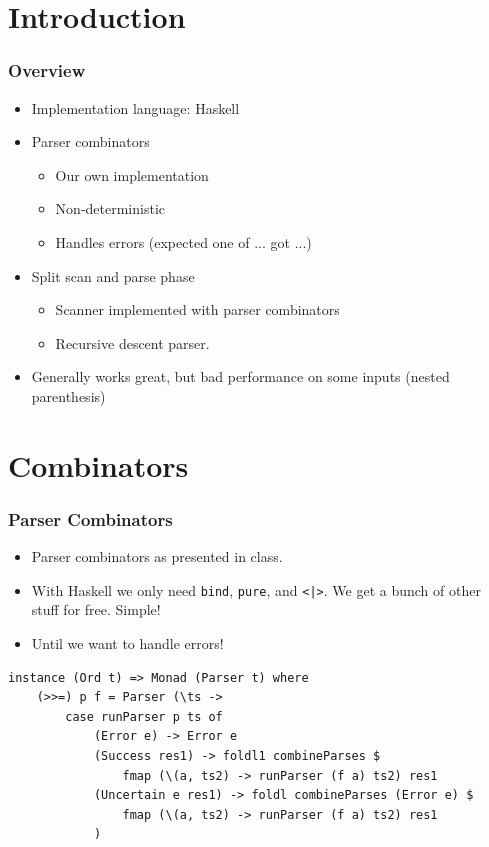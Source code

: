 \documentclass{beamer}
\begin{document}
\section{Introduction}
\begin{frame}
\frametitle{Overview}
\begin{itemize}
\item Implementation language: Haskell
\item Parser combinators
    \begin{itemize}
    \item Our own implementation
    \item Non-deterministic
    \item Handles errors (expected one of ... got ...)
    \end{itemize}
\item Split scan and parse phase
    \begin{itemize}
    \item Scanner implemented with parser combinators
    \item Recursive descent parser.
    \end{itemize}
\item Generally works great, but bad performance on some inputs (nested parenthesis)
\end{itemize}
\end{frame}

\section{Combinators}
\begin{frame}[fragile]

\frametitle{Parser Combinators}

\begin{itemize}
\item Parser combinators as presented in class.
\item With Haskell we only need \lstinline{bind}, \lstinline{pure}, and \lstinline{<|>}. We get a bunch of other stuff for free. Simple!
\item Until we want to handle errors!
\end{itemize}

\begin{lstlisting}
instance (Ord t) => Monad (Parser t) where
    (>>=) p f = Parser (\ts -> 
        case runParser p ts of
            (Error e) -> Error e
            (Success res1) -> foldl1 combineParses $
                fmap (\(a, ts2) -> runParser (f a) ts2) res1
            (Uncertain e res1) -> foldl combineParses (Error e) $
                fmap (\(a, ts2) -> runParser (f a) ts2) res1
            )
\end{lstlisting}

\end{frame}
\end{document}
